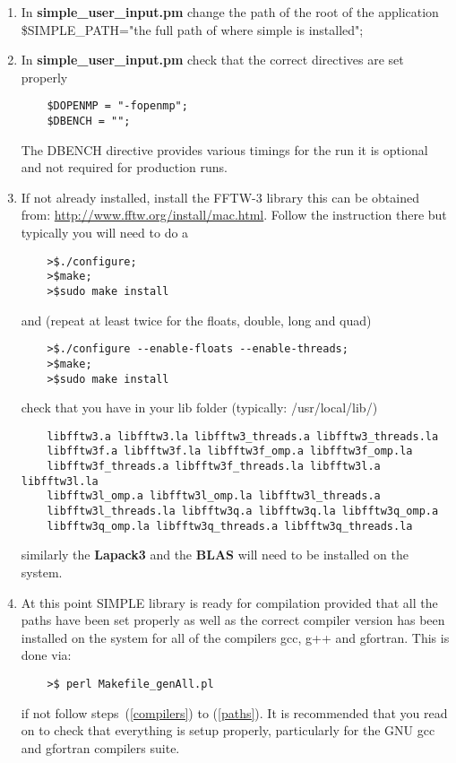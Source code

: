 \documentclass[review]{elsarticle}
\begin{document}
\begin{enumerate}

\item \label{copy}In {\bf{simple\_user\_input.pm}} change the path of the root of
  the application \$SIMPLE\_PATH="{the full path of where simple is
    installed}";
\item \label{directives} In {\bf{simple\_user\_input.pm}} check that
  the correct directives are set properly
\begin{verbatim}
    $DOPENMP = "-fopenmp";
    $DBENCH = "";
\end{verbatim}
The DBENCH directive provides various timings for the run it is
optional and not required for production runs.

\item {\label{fftw_inst}} If not already installed, install the FFTW-3 library
  this can be obtained from:
  \url{http://www.fftw.org/install/mac.html}. Follow the instruction
  there but typically you will need to do a
\begin{verbatim}
    >$./configure;
    >$make;
    >$sudo make install
\end{verbatim}
and (repeat at least twice for the floats, double, long and quad)
\begin{verbatim}
    >$./configure --enable-floats --enable-threads;
    >$make;
    >$sudo make install
\end{verbatim}

check that you have in your lib folder (typically: /usr/local/lib/)

\begin{verbatim}
    libfftw3.a libfftw3.la libfftw3_threads.a libfftw3_threads.la
    libfftw3f.a libfftw3f.la libfftw3f_omp.a libfftw3f_omp.la
    libfftw3f_threads.a libfftw3f_threads.la libfftw3l.a libfftw3l.la
    libfftw3l_omp.a libfftw3l_omp.la libfftw3l_threads.a
    libfftw3l_threads.la libfftw3q.a libfftw3q.la libfftw3q_omp.a
    libfftw3q_omp.la libfftw3q_threads.a libfftw3q_threads.la
\end{verbatim}

similarly the {\bf{Lapack3}} and the {\bf{BLAS}} will need to be
installed on the system.

\item \label{perlMake}At this point SIMPLE library is ready for
  compilation provided that all the paths have been set properly as
  well as the correct compiler version has been installed on the
  system for all of the compilers gcc, g++ and gfortran. This is done via:   
\begin{verbatim}
    >$ perl Makefile_genAll.pl
\end{verbatim}
if not follow steps~(\ref{compilers}) to (\ref{paths}). It is
recommended that you read on to check that everything is setup
properly, particularly for the GNU gcc and gfortran compilers suite.


\end{enumerate}
\end{document}
